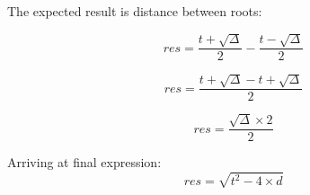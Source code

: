 \documentclass{article}
\begin{document}
The expected result is distance between roots:

\begin{displaymath}
    res = \frac{t + \sqrt{\Delta}}{2} - \frac{t - \sqrt{\Delta}}{2}
\end{displaymath}

\begin{displaymath}
    res = \frac{t + \sqrt{\Delta} - t + \sqrt{\Delta}}{2}
\end{displaymath}

\begin{displaymath}
    res = \frac{\sqrt{\Delta} \times 2}{2}
\end{displaymath}





Arriving at final expression:
\begin{equation}
    res = \sqrt{t^2 - 4 \times d}
\end{equation}
\end{document}
